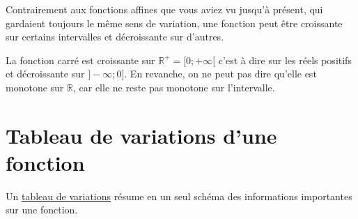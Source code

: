 \documentclass[10pt,a4paper,oneside]{book}
\newcommand{\R}{\mathbb{R}}
\begin{document}
Contrairement aux fonctions affines que vous aviez vu jusqu'à présent, qui gardaient toujours le même sens de variation, une fonction peut être croissante sur certains intervalles et décroissante sur d'autres. 

La fonction carré est croissante sur $\R^+=[0;+\infty[$ c'est à dire sur les réels positifs et décroissante sur $]-\infty;0]$.  En revanche, on ne peut pas dire qu'elle est monotone sur $\R$, car elle ne reste pas monotone sur l'intervalle.

\section{Tableau de variations d'une fonction}

Un \underline{tableau de variations} résume en un seul schéma des informations importantes sur une fonction.
\end{document}
